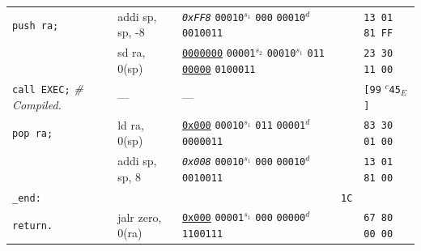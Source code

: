 \documentclass[a4paper,12pt,final]{article}
\begin{document}
\begin{table}[!htbp]
\begin{adjustwidth}{-1cm}{-1cm}
\begin{center}
\begin{tabular}{l|ll|l|l}
\hspace{1.053000em} \texttt{push ra;} & addi sp, sp, -8 & \emph{\texttt{0xFF8}}                    \texttt{00010}​\(^{s_{1}}\) \texttt{000} \texttt{00010}​\(^{d}\)  \texttt{0010011} &  & \texttt{13 01 81 FF}\\[0pt]
 & sd ra, 0(sp) & \uline{\texttt{0000000}} \texttt{00001}​\(^{s_{2}}\) \texttt{00010}​\(^{s_{1}}\) \texttt{011} \uline{\texttt{00000}} \texttt{0100011} &  & \texttt{23 30 11 00}\\[0pt]
\hspace{1.053000em} \texttt{call EXEC;}  \emph{\# Compiled.} & --- & --- &  & \texttt{[99} \(^{c}\)​\texttt{45}​\(_{E}\)​\texttt{]}\\[0pt]
\hspace{1.053000em} \texttt{pop ra;} & ld ra, 0(sp) & \uline{\texttt{0x000}}                    \texttt{00010}​\(^{s_{1}}\) \texttt{011} \texttt{00001}​\(^{d}\)  \texttt{0000011} &  & \texttt{83 30 01 00}\\[0pt]
\hspace{1.053000em} & addi sp, sp, 8 & \emph{\texttt{0x008}}                    \texttt{00010}​\(^{s_{1}}\) \texttt{000} \texttt{00010}​\(^{d}\)  \texttt{0010011} &  & \texttt{13 01 81 00}\\[0pt]
\texttt{\_end:} &  &  & \texttt{1C} & \\[0pt]
\hspace{1.053000em} \texttt{return.} & jalr zero, 0(ra) & \uline{\texttt{0x000}}                    \texttt{00001}​\(^{s_{1}}\) \texttt{000} \texttt{00000}​\(^{d}\)  \texttt{1100111} &  & \texttt{67 80 00 00}\\[0pt]
\end{tabular}

\end{center}
\normalsize \end{adjustwidth} \end{table} \vspace{0}
\end{document}
